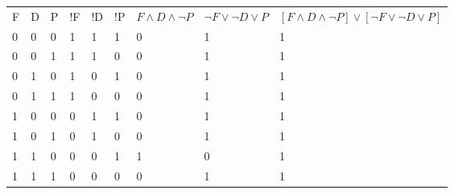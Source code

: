 \documentclass{article}
\begin{document}
\begin{table}[h]
  \begin{tabular}{lllllllll}
  F & D & P & !F & !D & !P & $F \wedge D \wedge \neg P$ & $\neg F \vee \neg D \vee P$ & $[F \wedge D \wedge \neg P] \vee [\neg F \vee \neg D \vee P]$ \\
  0 & 0 & 0 & 1  & 1  & 1  &  0            & 1                                & 1                                                                                                                                                                                                     \\
  0 & 0 & 1 & 1  & 1  & 0  &  0            & 1                                & 1                                                                                                                                                                                                     \\
  0 & 1 & 0 & 1  & 0  & 1  &  0            & 1                                & 1                                                                                                                                                                                                     \\
  0 & 1 & 1 & 1  & 0  & 0  &  0            & 1                                & 1                                                                                                                                                                                                     \\
  1 & 0 & 0 & 0  & 1  & 1  &  0            & 1                                & 1                                                                                                                                                                                                     \\
  1 & 0 & 1 & 0  & 1  & 0  &  0            & 1                                & 1                                                                                                                                                                                                     \\
  1 & 1 & 0 & 0  & 0  & 1  &  1            & 0                                & 1                                                                                                                                                                                                     \\
  1 & 1 & 1 & 0  & 0  & 0  &  0            & 1                                & 1                                                                                                                                                                                                    
  \end{tabular}
  \end{table}
\end{document}
